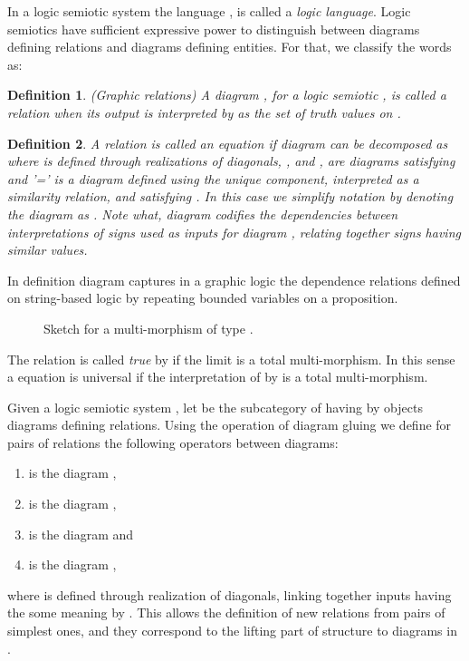 \documentclass[oribibl]{llncs}
\newtheorem{defn}{Definition}
\begin{document}
In a logic semiotic system  the language , is called a
\emph{logic language}. Logic semiotics have sufficient expressive power to distinguish between diagrams defining relations and diagrams defining entities. For that, we classify the words as:

\begin{defn}(Graphic relations)
A diagram , for a logic semiotic , is called a \emph{relation}
when its output  is interpreted by  as the set of truth values  on .
\end{defn}
\begin{defn}
A relation  is called an \emph{equation} if diagram  can be decomposed
as  where  is defined through realizations of diagonals,
, and , are diagrams satisfying  and '=' is a
diagram defined using the unique component, interpreted as a similarity relation, and
satisfying . In this case we simplify notation by denoting the diagram 
 as . Note what, diagram  codifies the dependencies between interpretations of signs used as inputs for diagram , relating together signs having similar values.
\end{defn}
In definition diagram  captures in a graphic logic the dependence relations defined on string-based logic by repeating bounded variables on a proposition.
\begin{figure}[h]

\caption{Sketch for a multi-morphism of type .}\label{identity2}
\end{figure}
The relation  is called \emph{true} by  if
the limit  is a total multi-morphism. In this sense a equation  is universal if the interpretation of  by  is
a total multi-morphism.

Given a logic semiotic system , let  be the
subcategory of  having by objects diagrams defining relations. Using the operation of diagram gluing we define for pairs of relations  the following operators between diagrams:
\begin{enumerate}
  \item  is the diagram ,
  \item  is the diagram ,
  \item  is the diagram 
  and
  \item  is the diagram ,
\end{enumerate}
where  is defined through realization of diagonals, linking
together inputs having the some meaning by . This allows the definition of new relations from pairs of simplest ones, and they correspond to the lifting part of  structure to diagrams in .
\end{document}
